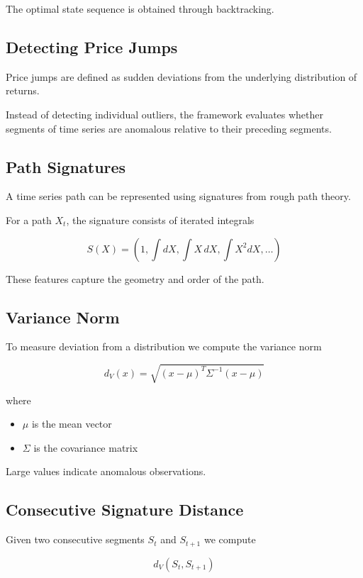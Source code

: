 \documentclass[11pt]{article}
\begin{document}
The optimal state sequence is obtained through backtracking.

\subsection{Detecting Price Jumps}

Price jumps are defined as sudden deviations from the underlying
distribution of returns.

Instead of detecting individual outliers, the framework evaluates
whether segments of time series are anomalous relative to their
preceding segments.

\subsection{Path Signatures}

A time series path can be represented using signatures from rough
path theory.

For a path $X_t$, the signature consists of iterated integrals

\[
S(X) =
\left(
1,
\int dX,
\int X\, dX,
\int X^2 dX,
\dots
\right)
\]

These features capture the geometry and order of the path.

\subsection{Variance Norm}

To measure deviation from a distribution we compute the variance
norm

\[
d_V(x) =
\sqrt{
(x-\mu)^T
\Sigma^{-1}
(x-\mu)
}
\]

where

\begin{itemize}
\item $\mu$ is the mean vector
\item $\Sigma$ is the covariance matrix
\end{itemize}

Large values indicate anomalous observations.

\subsection{Consecutive Signature Distance}

Given two consecutive segments $S_t$ and $S_{t+1}$ we compute

\[
d_V(S_t,S_{t+1})
\]
\end{document}
